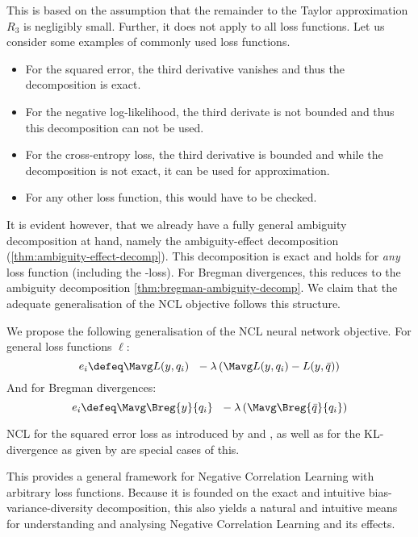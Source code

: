 \documentclass[../main.tex]{subfiles}
\begin{document}
This is based on the assumption that the remainder to the Taylor approximation $R_{3}$ is negligibly small. Further, it does not apply to all loss functions. Let us consider some examples of commonly used loss functions.
\begin{itemize}
\item For the squared error, the third derivative vanishes and thus the decomposition is exact.
\item For the negative log-likelihood,
the third derivate is not bounded and thus this decomposition can not be used.
\item For the cross-entropy loss, 
the third derivative is bounded and while the decomposition is not exact, it can be used for approximation. %
\item For any other loss function, this would have to be checked.
\end{itemize}

It is evident however, {that we already have a fully general ambiguity decomposition at hand}, namely the ambiguity-effect decomposition (\ref{thm:ambiguity-effect-decomp}). 
This decomposition is exact and holds for \textit{any} loss function (including the \zeroone-loss). 
For Bregman divergences, this reduces to the ambiguity decomposition \ref{thm:bregman-ambiguity-decomp}.
%
We claim that the adequate generalisation of the NCL objective follows this structure.
\begin{definition} We propose the following generalisation of the NCL neural network objective. For general loss functions $\ell$:
$$
e_{i} \defeq \Mavg L(y, q_{i}) ~ ~ - \lambda \left( 
\Mavg L(y, q_{i}) - L(y, \bar{q})
\right)
$$
And for Bregman divergences:
$$
e_{i} \defeq \Mavg \Breg{y}{q_{i}} ~ ~ - \lambda\left( \Mavg \Breg{\bar{q}}{q_{i}} \right)
$$
\end{definition}
NCL for the squared error loss as introduced by \cite{LiuYao} and \cite{brown2005}, as well as for the KL-divergence as given by \cite{webb} are special cases of this.

This provides a general framework for Negative Correlation Learning with arbitrary loss functions. Because it is founded on the exact and intuitive bias-variance-diversity decomposition, this also yields a natural and intuitive means for understanding and analysing Negative Correlation Learning and its effects.
\end{document}
